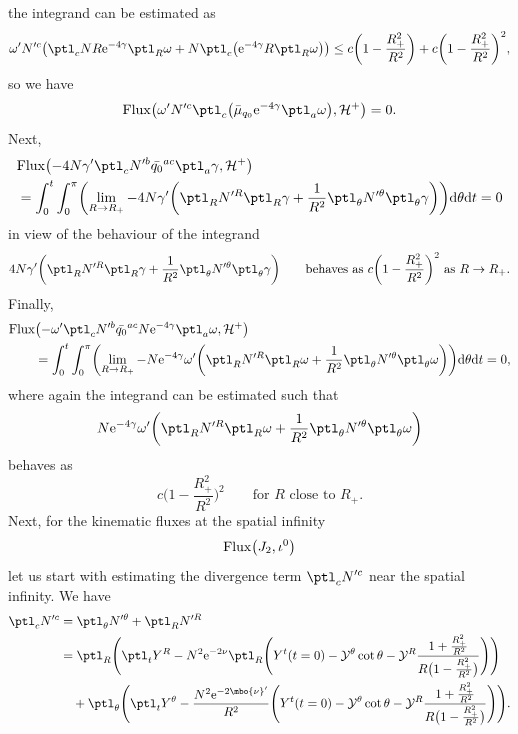 the integrand can be estimated as
\begin{align*}
\omega' N'^c \bigl(\ptl_c N R {\rm e}^{-4\gamma} \ptl_R \omega + N \ptl_c \bigl({\rm e}^{-4\gamma} R \ptl_R \omega\bigr)\bigr) \leq c \biggl(1- \frac{R^2_+}{R^2}\biggr) + c \biggl(1- \frac{R^2_+}{R^2}\biggr)^2,
\end{align*}
so we have
\begin{align*}
{\rm Flux} \bigl(\omega' N'^c \ptl_c \bigl(\bar{\mu}_{q_0} {\rm e}^{-4\gamma} \ptl_a \omega\bigr), \mathcal{H}^+\bigr) =0.
\end{align*}
Next,
\begin{align*}
& {\rm Flux} \bigl(-4 N \gamma' \ptl_c N'^b \bar{q_0}^{ac} \ptl_a \gamma, \mathcal{H}^+\bigr) \notag\\
&{}= \int^t_0 \int^\pi_0 \biggl(\lim_{R \to R_+} -4 N \gamma' \biggl(\ptl_R N'^R \ptl_R \gamma + \frac{1}{R^2} \ptl_\theta N'^ \theta \ptl_ \theta \gamma\biggr) \biggr) {\rm d}\theta {\rm d}t
 =0
\end{align*}
in view of the behaviour of the integrand
\begin{align*}
 4 N \gamma' \biggl(\ptl_R N'^R \ptl_R \gamma + \frac{1}{R^2} \ptl_\theta N'^ \theta \ptl_ \theta \gamma\biggr) \qquad \text{behaves as} \ c\biggl(1- \frac{R^2_+}{R^2}\biggr)^2 \ \text{as} \ R \to R_+.
\end{align*}
Finally,
\begin{align*}
& {\rm Flux} \bigl(-\omega' \ptl_c N'^b \bar{q_0}^{ac} N {\rm e}^{-4\gamma} \ptl_a \omega, \mathcal{H}^+\bigr) \notag \\
 &{}\qquad{}= \int^t_0 \int^\pi_0 \biggl(\lim_{R \to R_+} - N {\rm e}^{-4 \gamma} \omega' \biggl(\ptl_R N'^R \ptl_R \omega + \frac{1}{R^2} \ptl_\theta N'^\theta \ptl_\theta \omega\biggr) \biggr) {\rm d}\theta {\rm d}t
= 0,
\end{align*}
where again the integrand can be estimated such that
\[
N {\rm e}^{-4 \gamma} \omega' \biggl(\ptl_R N'^R \ptl_R \omega + \frac{1}{R^2} \ptl_\theta N'^\theta \ptl_\theta \omega\biggr)
\]
behaves as
\[
 c\biggl(1- \frac{R^2_+}{R^2}\biggr)^2 \qquad \text{for $R$ close to $R_+$}.
\]
Next, for the kinematic fluxes at the spatial infinity
\begin{align*}
{\rm Flux}\bigl(J_2, \iota^0\bigr)
\end{align*}
let us start with estimating the divergence term $\displaystyle \ptl_c N'^c$ near the spatial infinity. We have
\begin{align*}
\ptl_c N'^c &{}= \ptl_\theta N'^ \theta + \ptl_R N'^R \notag\\
&{}= \ptl_R \Biggl(\ptl_t Y^R - N^2 {\rm e}^{-2 \nu} \ptl_R \Biggl(Y^t(t=0) - \mathcal{Y}^ \theta \cot \theta - \mathcal{Y}^R \frac{ 1 + \frac{R^2_+}{R^2}}{ R \bigl(1- \frac{R^2_+}{R^2}\bigr)} \Biggr) \Biggr) \notag \\
&\quad{} + \ptl_\theta \Biggl(\ptl_t Y^\theta - \frac{N^2 {\rm e}^{-2\mbo{\nu}'}}{R^2} \Biggl(Y^t(t=0) - \mathcal{Y}^\theta \cot \theta - \mathcal{Y}^R \frac{ 1 + \frac{R^2_+}{R^2}}{ R \bigl(1- \frac{R^2_+}{R^2}\bigr)}\Biggr)\Biggr).
\end{align*}

